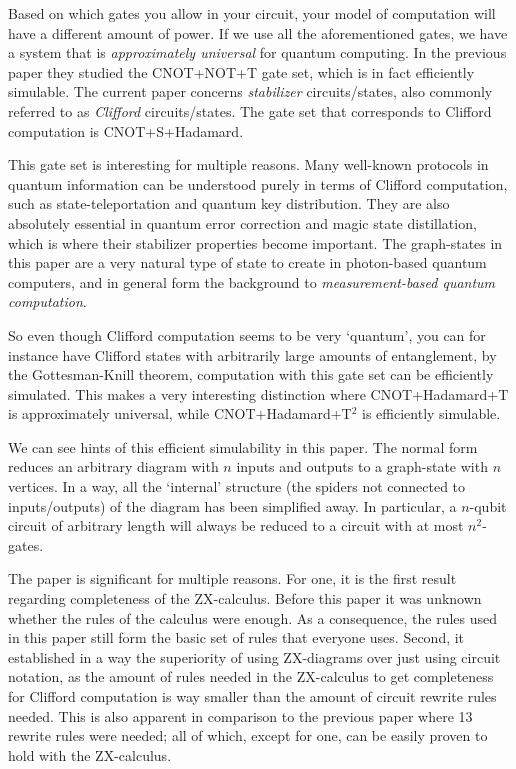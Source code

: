 \documentclass{amsart}
\begin{document}
Based on which gates you allow in your circuit, your model of computation will have a different amount of power. If we use all the aforementioned gates, we have a system that is \emph{approximately universal} for quantum computing. In the previous paper they studied the CNOT+NOT+T gate set, which is in fact efficiently simulable. The current paper concerns \emph{stabilizer} circuits/states, also commonly referred to as \emph{Clifford} circuits/states. The gate set that corresponds to Clifford computation is CNOT+S+Hadamard.

This gate set is interesting for multiple reasons. Many well-known protocols in quantum information can be understood purely in terms of Clifford computation, such as state-teleportation and quantum key distribution. They are also absolutely essential in quantum error correction and magic state distillation, which is where their stabilizer properties become important. The graph-states in this paper are a very natural type of state to create in photon-based quantum computers, and in general form the background to \emph{measurement-based quantum computation}.

So even though Clifford computation seems to be very `quantum', you can for instance have Clifford states with arbitrarily large amounts of entanglement, by the Gottesman-Knill theorem, computation with this gate set can be efficiently simulated. This makes a very interesting distinction where CNOT+Hadamard+T is approximately universal, while CNOT+Hadamard+T$^2$ is efficiently simulable.

We can see hints of this efficient simulability in this paper. The normal form reduces an arbitrary diagram with $n$ inputs and outputs to a graph-state with $n$ vertices. In a way, all the `internal' structure (the spiders not connected to inputs/outputs) of the diagram has been simplified away. In particular, a $n$-qubit circuit of arbitrary length will always be reduced to a circuit with at most $n^2$-gates.

The paper is significant for multiple reasons. For one, it is the first result regarding completeness of the ZX-calculus. Before this paper it was unknown whether the rules of the calculus were enough. As a consequence, the rules used in this paper still form the basic set of rules that everyone uses. Second, it established in a way the superiority of using ZX-diagrams over just using circuit notation, as the amount of rules needed in the ZX-calculus to get completeness for Clifford computation is way smaller than the amount of circuit rewrite rules needed. This is also apparent in comparison to the previous paper where 13 rewrite rules were needed; all of which, except for one, can be easily proven to hold with the ZX-calculus.
\end{document}
